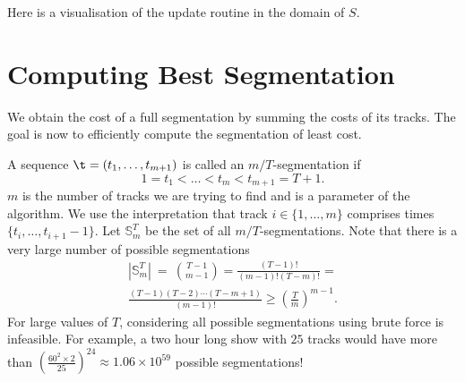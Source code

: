 \documentclass[twocolumn]{article}
\newcommand{\segs}{\mathbb S}
\begin{document}
Here is a visualisation of the update routine in the domain of $S$.

    \begin{center}
    \end{center}

\section{Computing Best Segmentation}\label{best_cost}

We obtain the cost of a full segmentation by summing the costs of its tracks. The goal is now to efficiently compute the segmentation of least cost.


A sequence $\t = (t_1, \ldots, t_{m+1})$ is called an $m/T$-segmentation if
\[
1 = t_1 < \ldots < t_m < t_{m+1} = T+1.
\]
$m$ is the number of tracks we are trying to find and is a parameter of the algorithm. We use the interpretation that track $i \in \{1, \ldots, m\}$ comprises times $\{t_i, \ldots, t_{i+1}-1\}$. Let $\segs^T_m$ be the set of all $m/T$-segmentations. Note that there is a very large number of possible segmentations 
\begin{multline*}
|\segs^T_m| ~=~ \binom{T-1}{m-1}
= \frac{(T-1)!}{(m-1)!(T-m)!} =\\
 \frac{(T-1)(T-2)\cdots(T-m+1)}{(m-1)!} \ge \left( \frac{T}{m}\right)^{m-1}.
\end{multline*} 
For large values of $T$, considering all possible segmentations using brute force is infeasible. For example, a two hour long show with $25$ tracks would have more than $\left( \frac{60^2 \times 2}{25}\right)^{24}  \approx 1.06 \times 10^{59}$ possible segmentations! 
\end{document}

